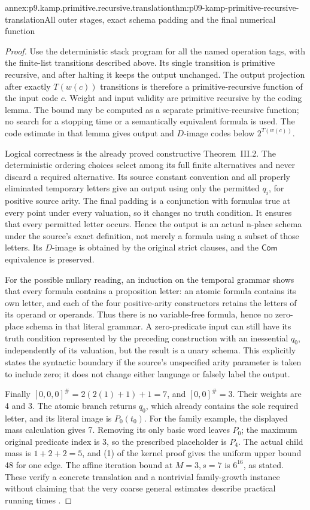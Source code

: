 \begin{annexitem}{annex:p9.kamp.primitive.recursive.translation}{thm:p09-kamp-primitive-recursive-translation}{All outer stages, exact schema padding and the final numerical function}
\begin{proof}
Use the deterministic stack program for all the named operation
tags, with the finite-list transitions described above. Its
single transition is primitive recursive, and after halting it
keeps the output unchanged. The output projection after exactly
\(T(w(c))\) transitions is therefore a primitive-recursive
function of the input code \(c\). Weight and input validity
are primitive recursive by the coding lemma. The bound may be
computed as a separate primitive-recursive function; no search
for a stopping time or a semantically equivalent formula is used.
The code estimate in that lemma gives output and \(D\)-image
codes below \(2^{T(w(c))}\).

Logical correctness is the already proved constructive Theorem~III.2.
The deterministic ordering choices select among its full finite
alternatives and never discard a required alternative. Its source
constant convention and all properly eliminated temporary letters
give an output using only the permitted \(q_i\), for positive
source arity. The final padding is a conjunction with formulas
true at every point under every valuation, so it changes no truth
condition. It ensures that every permitted letter occurs. Hence
the output is an actual n-place schema under the source's exact
definition, not merely a formula using a subset of those letters.
Its \(D\)-image is obtained by the original strict clauses,
and the \(\mathsf{Com}\) equivalence is preserved.

For the possible nullary reading, an induction on the temporal
grammar shows that every formula contains a proposition letter:
an atomic formula contains its own letter, and each of the four
positive-arity constructors retains the letters of its operand or
operands. Thus there is no variable-free formula, hence no
zero-place schema in that literal grammar. A zero-predicate input
can still have its truth condition represented by the preceding
construction with an inessential \(q_0\), independently of
its valuation, but the result is a unary schema. This explicitly
states the syntactic boundary if the source's unspecified arity
parameter is taken to include zero; it does not change either
language or falsely label the output.

Finally \([0,0,0]^\#=2(2(1)+1)+1=7\), and
\([0,0]^\#=3\). Their weights are 4 and 3. The atomic
branch returns \(q_0\), which already contains the sole
required letter, and its literal image is \(P_0(t_0)\).
For the family example, the displayed mass calculation gives 7.
Removing its only basic word leaves \(P_0\); the maximum original
predicate index is 3, so the prescribed placeholder is \(P_4\).
The actual child mass is \(1+2+2=5\), and (1) of the
kernel proof gives the uniform upper bound 48 for one edge. The affine
iteration bound at \(M=3,s=7\) is \(6^{16}\), as stated.
These verify a concrete translation and a nontrivial family-growth
instance without claiming that the very coarse general estimates
describe practical running times \cite[ch.~II, pp.~21--23,28]{Kamp1968}.
\end{proof}
\end{annexitem}
